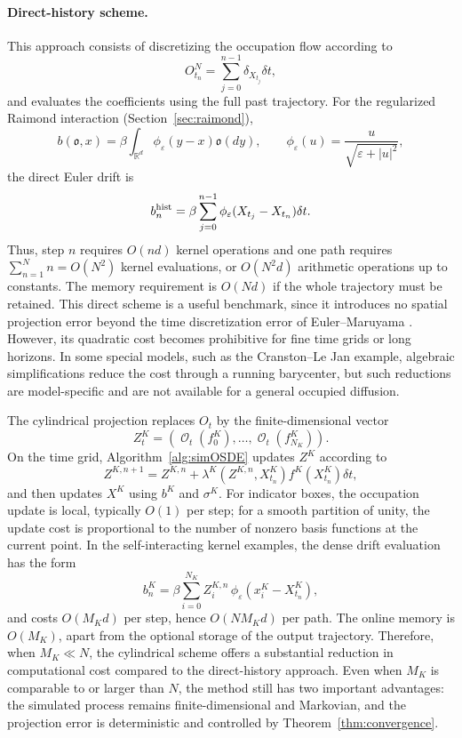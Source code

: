 \documentclass[11pt]{article}
\numberwithin{equation}{section}
\theoremstyle{plain}
\theoremstyle{definition}
\DeclareMathOperator{\calO}{\mathcal{O}}
\def\mo{\mathfrak{o}}
\begin{document}
\paragraph{Direct-history scheme.} This approach consists of discretizing the occupation flow according to 
\[
O^N_{t_n}=\sum_{j=0}^{n-1}\delta_{X_{t_j}} \delta t,
\]
and evaluates the coefficients using the full past trajectory. For the
regularized Raimond interaction (Section~\ref{sec:raimond}), %
\begin{equation}\label{eq:raimondDrift}
    b(\mo,x)=\beta\int_{\mathbb R^d}\phi_\varepsilon(y-x)\mo(dy),
\qquad
\phi_\varepsilon(u)=\frac{u}{\sqrt{\varepsilon+|u|^2}},
\end{equation}
the direct Euler drift is
\[
b_n^{\rm hist}
=
\beta \sum_{j=0}^{n-1}\phi_\varepsilon(X_{t_j}-X_{t_n})\delta t.
\]
Thus, step \(n\) requires \(O(nd)\) kernel operations and one path requires
$ \sum_{n=1}^{N} n = O(N^2) $
kernel evaluations, or \(O(N^2d)\) arithmetic operations up to constants. The memory
requirement is \(O(Nd)\) if the whole trajectory must be retained. This direct scheme is
a useful benchmark, since it introduces no spatial projection error beyond the time
discretization error of Euler--Maruyama \cite{KloedenPlaten}. However, its quadratic
cost becomes prohibitive for fine time grids or long horizons. In some
special models, such as the Cranston--Le Jan example, algebraic simplifications reduce
the cost through a running barycenter, but such reductions are model-specific and are
not available for a general occupied diffusion. %

The cylindrical projection replaces \(O_t\) by the finite-dimensional vector
\[
Z^K_t=(\calO_t(f^K_0),\ldots,\calO_t(f^K_{N_K})).
\]
On the time grid, Algorithm~\ref{alg:simOSDE} updates $Z^K$ according to 
\[
Z^{K,n+1}
=
Z^{K,n}
+
\lambda^K(Z^{K,n},X^K_{t_n})f^K(X^K_{t_n}) \delta t,
\]
and then updates \(X^K\) using \(b^K\) and \(\sigma^K\). For indicator boxes, the
occupation update is local, typically \(O(1)\) per step; for a smooth partition of unity,
the update cost is proportional to the number of nonzero basis functions at the current
point. In the self-interacting kernel examples, the dense drift evaluation  has the form
\[
b_n^K
=
\beta\sum_{i=0}^{N_K} Z_i^{K,n}\,
\phi_\varepsilon(x_i^K-X^K_{t_n}),
\]
and costs \(O(M_Kd)\) per step, hence \(O(NM_Kd)\) per path. The online memory is
\(O(M_K)\), apart from the optional storage of the output trajectory. Therefore, when
\(M_K\ll N\), the cylindrical scheme offers a substantial reduction in computational cost compared to the direct-history approach. Even when \(M_K\) is comparable to or larger than \(N\), the method still has two
important advantages: the simulated process remains finite-dimensional and Markovian,
and the projection error is deterministic and controlled by Theorem~\ref{thm:convergence}.
\end{document}
